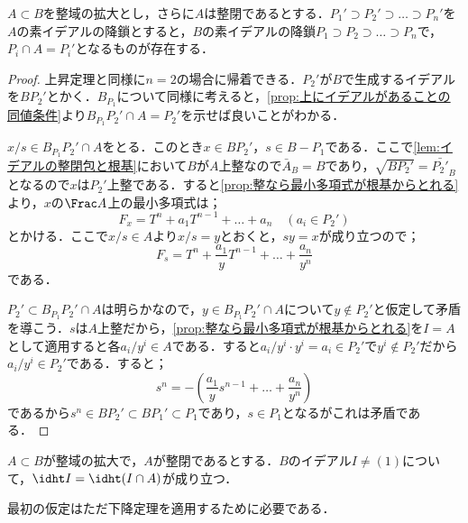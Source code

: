 \begin{thm}[下降定理]\label{thm:going down}
	$A\subset B$を整域の拡大とし，さらに$A$は整閉であるとする．$P_1'\supset P_2'\supset\dots\supset P_n'$を$A$の素イデアルの降鎖とすると，$B$の素イデアルの降鎖$P_1\supset P_2\supset\dots\supset P_n$で，$P_i\cap A=P_i'$となるものが存在する．
\end{thm}

\begin{proof}
	上昇定理と同様に$n=2$の場合に帰着できる．$P_2'$が$B$で生成するイデアルを$BP_2'$とかく．$B_{P_1}$について同様に考えると，\ref{prop:上にイデアルがあることの同値条件}より$B_{P_1}P_2'\cap A=P_2'$を示せば良いことがわかる．
	
	$x/s\in B_{P_1}P_2'\cap A$をとる．このとき$x\in BP_2'，s\in B-P_1$である．ここで\ref{lem:イデアルの整閉包と根基}において$B$が$A$上整なので$\bar{A}_B=B$であり，$\sqrt{BP_2'}=\bar{P_2'}_B$となるので$x$は$P_2'$上整である．すると\ref{prop:整なら最小多項式が根基からとれる}より，$x$の$\Frac A$上の最小多項式は；
	\[F_x=T^n+a_1T^{n-1}+\dots+a_n\quad(a_i\in P_2')\]
	とかける．ここで$x/s\in A$より$x/s=y$とおくと，$sy=x$が成り立つので；
	\[F_s=T^n+\frac{a_1}{y}T^{n-1}+\dots+\frac{a_n}{y^n}\]
	である．
	
	$P_2'\subset B_{P_1}P_2'\cap A$は明らかなので，$y\in B_{P_1}P_2'\cap A$について$y\not\in P_2'$と仮定して矛盾を導こう．$s$は$A$上整だから，\ref{prop:整なら最小多項式が根基からとれる}を$I=A$として適用すると各$a_i/y^i\in A$である．すると$a_i/y^i\cdot y^i=a_i\in P_2'$で$y^i\not\in P_2'$だから$a_i/y^i\in P_2'$である．すると；
	\[s^n=-\left(\frac{a_1}{y}s^{n-1}+\dots+\frac{a_n}{y^n}\right)\]
	であるから$s^n\in BP_2'\subset BP_1'\subset P_1$であり，$s\in P_1$となるがこれは矛盾である．
\end{proof}
\begin{cor}\label{cor:上にあるイデアルの高さ}
	$A\subset B$が整域の拡大で，$A$が整閉であるとする．$B$のイデアル$I\neq(1)$について，$\idht I=\idht (I\cap A)$が成り立つ．	
\end{cor}

最初の仮定はただ下降定理を適用するために必要である．


